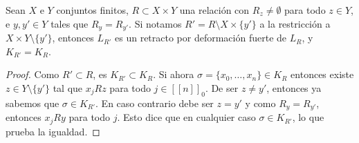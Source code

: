 \documentclass[11pt]{article}
\newcommand{\nat}[1]{[\![#1]\!]}
\newcommand{\natzero}[1]{\nat{#1}_0}
\newcommand{\paint}[1]{\color{color}{#1}}
\newenvironment{lemma}[2][Lema]{\begin{trivlist}
\item[\hskip \labelsep \paint{{\bfseries #1}}\hskip \labelsep {\bfseries #2.}]}{\end{trivlist}}
\begin{document}
\begin{lemma}{7} Sean $X$ e $Y$ conjuntos finitos, $R \subset X \times Y$ una relaci\'on con $R_z \neq  \emptyset$ para todo $z \in Y$, e $y,y' \in Y$ tales que $R_y = R_{y'}$.  Si notamos $R'= R \setminus X \times \{y'\}$ a la restricci\'on a $X \times Y \setminus \{y'\}$, entonces $L_{R'}$ es un retracto por deformaci\'on fuerte de $L_R$, y $K_{R'} = K_{R}$.
\end{lemma}
\begin{proof} Como $R' \subset R$, es $K_{R'} \subset K_R$. Si ahora $\sigma = \{x_0, \dots, x_n \} \in K_{R}$ entonces existe $z \in Y \setminus \{y'\}$ tal que $x_jRz$ para todo $j \in \natzero{n}$. De ser $z \neq y'$, entonces ya sabemos que $\sigma \in K_{R'}$. En caso contrario debe ser $z = y'$ y como $R_y = R_{y'}$, entonces $x_jRy$ para todo $j$. Esto dice que en cualquier caso $\sigma \in K_{R'}$, lo que prueba la igualdad.


\end{proof}
\end{document}
